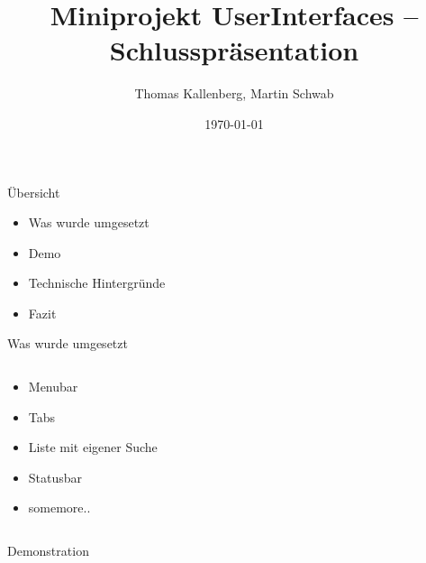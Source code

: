\documentclass[]{beamer}
\title{Miniprojekt UserInterfaces -- Schlusspräsentation}
\author{Thomas Kallenberg, Martin Schwab}
\institute{HSR Hochschule Rapperswil}
\date{ \today }
\begin{document}
\begin{frame}
  \titlepage
\end{frame}

\begin{frame}{Übersicht}
\begin{itemize}
\item Was wurde umgesetzt
\item Demo
\item Technische Hintergründe
\item Fazit
\end{itemize}
\end{frame}

\begin{frame}{Was wurde umgesetzt}
\begin{columns}[t]
  \begin{column}{5cm}
  \begin{itemize}
    \item Menubar
    \item Tabs
    \item Liste mit eigener Suche
    \item Statusbar
    \item somemore..
  \end{itemize}

  \end{column}
  \begin{column}{5cm}
  \end{column}
\end{columns}
\end{frame}

\begin{frame}{Demonstration}
\begin{columns}[t]
  \begin{column}{5cm}
  \end{column}
  \begin{column}{5cm}
  \end{column}
\end{columns}
\end{frame}
\end{document}
